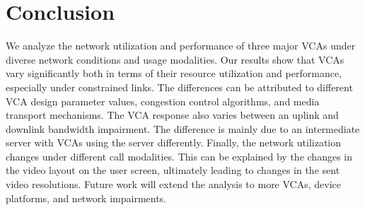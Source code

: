 \section{Conclusion}
\label{sec:conclusion}
We analyze the network utilization and performance of three major VCAs under diverse network conditions and usage modalities. Our results show that VCAs vary significantly both in terms of their resource utilization and performance, especially under constrained links. The differences can be attributed to different VCA design parameter values, congestion control algorithms, and media transport mechanisms. The VCA response also varies between an uplink and downlink bandwidth impairment. The difference is mainly due to an intermediate server with VCAs using the server differently. Finally, the network utilization changes under different call modalities. This can be explained by the changes in the video layout on the user screen, ultimately leading to changes in the sent video resolutions. Future work will extend the analysis to more VCAs, device platforms, and network impairments. 

